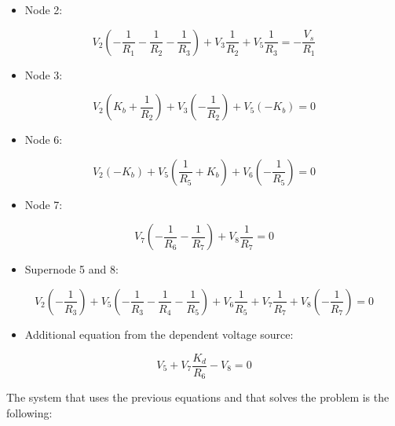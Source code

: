 \begin{itemize}
    \item Node 2:
\end{itemize}
\begin{equation}
    V_{2}(-\frac{1}{R_{1}}-\frac{1}{R_{2}}-\frac{1}{R_{3}})+V_{3}\frac{1}{R_{2}}+V_{5}\frac{1}{R_{3}} = -\frac{V_{s}}{R_{1}}
\end{equation}

\begin{itemize}
    \item Node 3:
\end{itemize}
\begin{equation}
    V_{2}(K_{b}+\frac{1}{R_{2}})+V_{3}(-\frac{1}{R_{2}})+V_{5}(-K_{b}) = 0
\end{equation}

\begin{itemize}
    \item Node 6:
\end{itemize}
\begin{equation}
    V_{2}(-K_{b})+V_{5}(\frac{1}{R_{5}}+K_{b})+V_{6}(-\frac{1}{R_{5}}) = 0
\end{equation}

\begin{itemize}
    \item Node 7:
\end{itemize}
\begin{equation}
    V_{7}(-\frac{1}{R_{6}}-\frac{1}{R_{7}})+V_{8}\frac{1}{R_{7}} = 0
\end{equation}

\begin{itemize}
    \item Supernode 5 and 8:
\end{itemize}
\begin{equation}
    V_{2}(-\frac{1}{R_{3}})+V_{5}(-\frac{1}{R_{3}}-\frac{1}{R_{4}}-\frac{1}{R_{5}})+ V_{6}\frac{1}{R_{5}}+V_{7}\frac{1}{R_{7}}+V_{8}(-\frac{1}{R_{7}})= 0
\end{equation}

\begin{itemize}
    \item Additional equation from the dependent voltage source:
\end{itemize}
\begin{equation}
    V_{5}+V_{7}\frac{K_{d}}{R_{6}}-V_{8}=0
\end{equation}

\par
The system that uses the previous equations and that solves the problem is the following:


